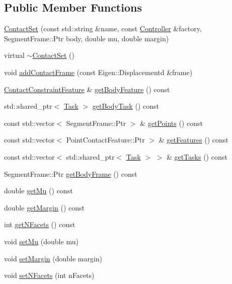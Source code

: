 \subsection*{Public Member Functions}
\begin{DoxyCompactItemize}
\item 
\hyperlink{classocra_1_1ContactSet_aa1bc409bbd509f1b56ab6de851102435}{Contact\+Set} (const std\+::string \&name, const \hyperlink{classocra_1_1Controller}{Controller} \&factory, Segment\+Frame\+::\+Ptr body, double mu, double margin)
\item 
virtual \hyperlink{classocra_1_1ContactSet_ad41eb11994dbd12c9fc55997428e256f}{$\sim$\+Contact\+Set} ()
\item 
void \hyperlink{classocra_1_1ContactSet_ac6b33a6ece44daaa338cdf5a761b522a}{add\+Contact\+Frame} (const Eigen\+::\+Displacementd \&frame)
\item 
\hyperlink{classocra_1_1ContactConstraintFeature}{Contact\+Constraint\+Feature} \& \hyperlink{classocra_1_1ContactSet_a4964e9d36665f3342d8dc563e61784a1}{get\+Body\+Feature} () const 
\item 
std\+::shared\+\_\+ptr$<$ \hyperlink{classocra_1_1Task}{Task} $>$ \hyperlink{classocra_1_1ContactSet_a67b775b0b30b88c444a19c51d70527aa}{get\+Body\+Task} () const 
\item 
const std\+::vector$<$ Segment\+Frame\+::\+Ptr $>$ \& \hyperlink{classocra_1_1ContactSet_af3e2148a0458cb0a48143351ee57336d}{get\+Points} () const 
\item 
const std\+::vector$<$ Point\+Contact\+Feature\+::\+Ptr $>$ \& \hyperlink{classocra_1_1ContactSet_a213c80ded6aa63de13ca4e0cabf404ca}{get\+Features} () const 
\item 
const std\+::vector$<$ std\+::shared\+\_\+ptr$<$ \hyperlink{classocra_1_1Task}{Task} $>$ $>$ \& \hyperlink{classocra_1_1ContactSet_a85bf8a42cef7d7c48d4cf435a5cd32ba}{get\+Tasks} () const 
\item 
Segment\+Frame\+::\+Ptr \hyperlink{classocra_1_1ContactSet_a6b14fd20db8fd25a6cd134694cf64611}{get\+Body\+Frame} () const 
\item 
double \hyperlink{classocra_1_1ContactSet_ad7f8dae89af52ceb0b1c4a7b2f275b84}{get\+Mu} () const 
\item 
double \hyperlink{classocra_1_1ContactSet_ad0baf5157c485d53fe1c754e572230b4}{get\+Margin} () const 
\item 
int \hyperlink{classocra_1_1ContactSet_aeef3aae215e913521e23d0666f2cd34f}{get\+N\+Facets} () const 
\item 
void \hyperlink{classocra_1_1ContactSet_a54d6c7d8c1266300f8a4f6d1be754630}{set\+Mu} (double mu)
\item 
void \hyperlink{classocra_1_1ContactSet_adb5aa2d4b3463d328d4687ca352b4c04}{set\+Margin} (double margin)
\item 
void \hyperlink{classocra_1_1ContactSet_a223ef9c14b40a257d026112af1a6b279}{set\+N\+Facets} (int n\+Facets)
\end{DoxyCompactItemize}


